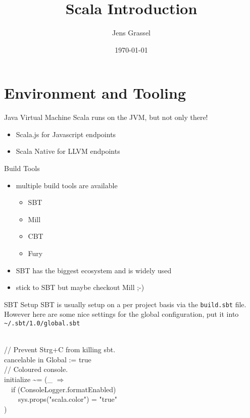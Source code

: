 \documentclass[10pt]{beamer}
\title{Scala Introduction}
\date{\today}
\author{Jens Grassel}
\institute{Wegtam GmbH}
\begin{document}
  \maketitle

  \section{Environment and Tooling}
  \begin{frame}{Java Virtual Machine}
    Scala runs on the JVM, but not only there!
    \begin{itemize}
      \item Scala.js for Javascript endpoints
      \item Scala Native for LLVM endpoints
    \end{itemize}
  \end{frame}

  \begin{frame}{Build Tools}
    \begin{itemize}
      \item multiple build tools are available
	\begin{itemize}
	  \item SBT
	  \item Mill
	  \item CBT
	  \item Fury
	\end{itemize}
      \item SBT has the biggest ecosystem and is widely used
      \item stick to SBT but maybe checkout Mill ;-)
    \end{itemize}
  \end{frame}

  \begin{frame}{SBT Setup}
    SBT is usually setup on a per project basis via the \texttt{build.sbt} file.
    However here are some nice settings for the global configuration, put it 
    into \texttt{\~{}/.sbt/1.0/global.sbt}\\
    \begin{texttt}
      \\
      // Prevent Strg+C from killing sbt.\\
      cancelable in Global := true\\
      // Coloured console.\\
      initialize \~{}= (\_ $\Rightarrow$\\
      ~~if (ConsoleLogger.formatEnabled)\\
      ~~~~sys.props("scala.color") = "true"\\
      )
    \end{texttt}
  \end{frame}
\end{document}
